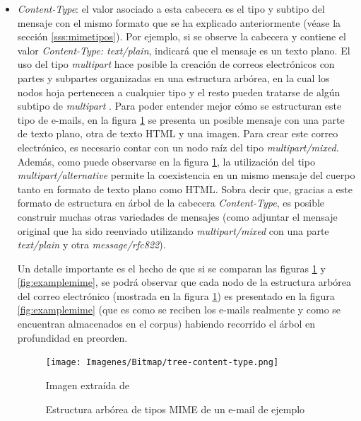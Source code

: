 \begin{itemize}
	\item \textit{Content-Type}: el valor asociado a esta cabecera es el tipo y subtipo del mensaje con el mismo formato que se ha explicado anteriormente (véase la sección \ref{sss:mimetipos}). Por ejemplo, si se observe la cabecera y contiene el valor \textit{Content-Type: text/plain}, indicará que el mensaje es un texto plano. El uso del tipo \textit{multipart} hace posible la creación de correos electrónicos con partes y subpartes organizadas en una estructura arbórea, en la cual los nodos hoja pertenecen a cualquier tipo y el resto pueden tratarse de algún subtipo de \textit{multipart} \citep[Sección 7.2]{rfc1341}. Para poder entender mejor cómo se estructuran este tipo de e-mails, en la figura \ref{fig:content-type} se presenta un posible mensaje con una parte de texto plano, otra de texto HTML y una imagen. Para crear este correo electrónico, es necesario contar con un nodo raíz del tipo \textit{multipart/mixed}. Además, como puede observarse en la figura \ref{fig:content-type}, la utilización del tipo \textit{multipart/alternative} permite la coexistencia en un mismo mensaje del cuerpo tanto en formato de texto plano como HTML. Sobra decir que, gracias a este formato de estructura en árbol de la cabecera \textit{Content-Type}, es posible construir muchas otras variedades de mensajes (como adjuntar el mensaje original que ha sido reenviado utilizando \textit{multipart/mixed} con una parte \textit{text/plain} y otra \textit{message/rfc822}).
	
	Un detalle importante es el hecho de que si se comparan las figuras \ref{fig:content-type} y \ref{fig:examplemime}, se podrá observar que cada nodo de la estructura arbórea del correo electrónico (mostrada en la figura \ref{fig:content-type}) es presentado en la figura \ref{fig:examplemime} (que es como se reciben los e-mails realmente y como se encuentran almacenados en el corpus) habiendo recorrido el árbol en profundidad en preorden.
	
	\begin{figure}[t]
		\centering%
		\centerline{\texttt{[image: Imagenes/Bitmap/tree-content-type.png]}}%
		\caption{Estructura arbórea de tipos MIME de un e-mail de ejemplo}%
		\label{fig:content-type}
		Imagen extraída de \cite{mitfg}
	\end{figure}


\end{itemize}
